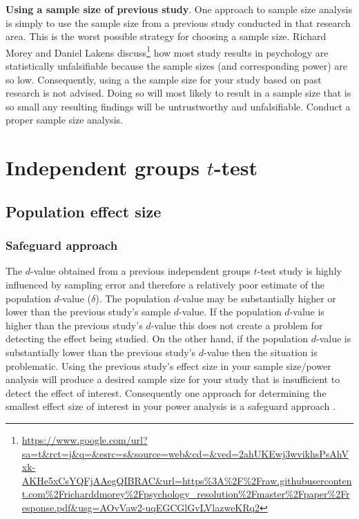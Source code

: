 \documentclass[
]{krantz}
\makeatletter
\renewcommand{\href}[2]{#2\footnote{\url{#1}}}
\newenvironment{kframe}{%
\medskip{}
\setlength{\fboxsep}{.8em}
 \def\at@end@of@kframe{}%
 \ifinner\ifhmode%
  \def\at@end@of@kframe{\end{minipage}}%
  \begin{minipage}{\columnwidth}%
 \fi\fi%
 \def\FrameCommand##1{\hskip\@totalleftmargin \hskip-\fboxsep
 \colorbox{shadecolor}{##1}\hskip-\fboxsep
     \hskip-\linewidth \hskip-\@totalleftmargin \hskip\columnwidth}%
 \MakeFramed {\advance\hsize-\width
   \@totalleftmargin\z@ \linewidth\hsize
   \@setminipage}}%
 {\par\unskip\endMakeFramed%
 \at@end@of@kframe}
\newenvironment{rmdblock}[1]
  {
  \begin{itemize}
  \renewcommand{\labelitemi}{
    \raisebox{-.7\height}[0pt][0pt]{
      {\setkeys{Gin}{width=3em,keepaspectratio}\texttt{[image: images/\#1]}}
    }
  }
  \setlength{\fboxsep}{1em}
  \begin{kframe}
  \item
  }
  {
  \end{kframe}
  \end{itemize}
  }
\newenvironment{rmdcaution}
  {\begin{rmdblock}{caution}}
  {\end{rmdblock}}
\makeatother
\begin{document}
\begin{rmdcaution}
\textbf{Using a sample size of previous study}. One approach to sample size analysis is simply to use the sample size from a previous study conducted in that research area. This is the worst possible strategy for choosing a sample size. Richard Morey and Daniel Lakens \href{https://www.google.com/url?sa=t\&rct=j\&q=\&esrc=s\&source=web\&cd=\&ved=2ahUKEwj3wvikhsPsAhVxk-AKHe5xCsYQFjAAegQIBRAC\&url=https\%3A\%2F\%2Fraw.githubusercontent.com\%2Fricharddmorey\%2Fpsychology_resolution\%2Fmaster\%2Fpaper\%2Fresponse.pdf\&usg=AOvVaw2-uqEGCGlGvLVlazweKRq2}{discuss} how most study results in psychology are statistically unfalsifiable because the sample sizes (and corresponding power) are so low. Consequently, using a the sample size for your study based on past research is not advised. Doing so will most likely to result in a sample size that is so small any resulting findings will be untrustworthy and unfalsifiable. Conduct a proper sample size analysis.
\end{rmdcaution}

\hypertarget{independent-groups-t-test}{%
\section{\texorpdfstring{Independent groups \(t\)-test}{Independent groups t-test}}\label{independent-groups-t-test}}

\hypertarget{population-effect-size}{%
\subsection{Population effect size}\label{population-effect-size}}

\hypertarget{safeguard-approach}{%
\subsubsection{Safeguard approach}\label{safeguard-approach}}

The \(d\)-value obtained from a previous independent groups \(t\)-test study is highly influenced by sampling error and therefore a relatively poor estimate of the population \(d\)-value (\(\delta\)). The population \(d\)-value may be substantially higher or lower than the previous study's sample \(d\)-value. If the population \(d\)-value is higher than the previous study's \(d\)-value this does not create a problem for detecting the effect being studied. On the other hand, if the population \(d\)-value is substantially lower than the previous study's \(d\)-value then the situation is problematic. Using the previous study's effect size in your sample size/power analysis will produce a desired sample size for your study that is insufficient to detect the effect of interest. Consequently one approach for determining the smallest effect size of interest in your power analysis is a safeguard approach \citep{perugini2014safeguard}.
\end{document}
